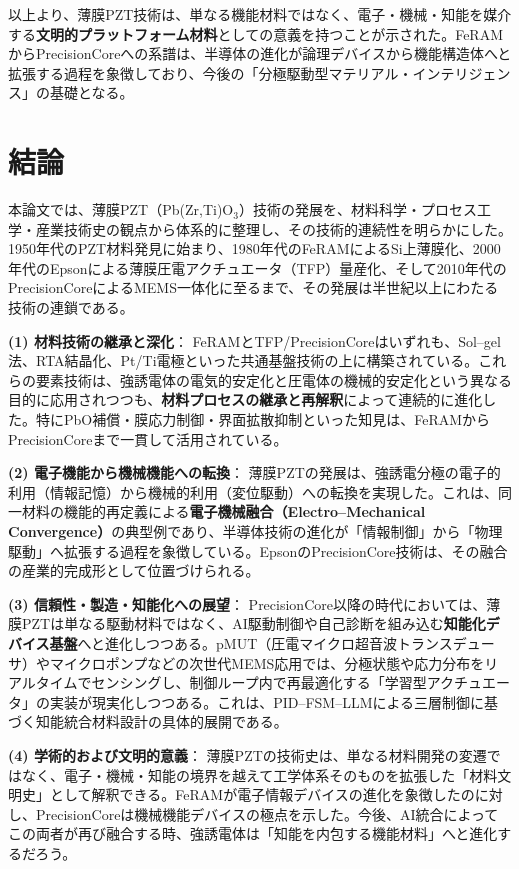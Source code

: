 \documentclass[conference]{IEEEtran}
\begin{document}
\medskip
以上より、薄膜PZT技術は、単なる機能材料ではなく、電子・機械・知能を媒介する\textbf{文明的プラットフォーム材料}としての意義を持つことが示された。FeRAMからPrecisionCoreへの系譜は、半導体の進化が論理デバイスから機能構造体へと拡張する過程を象徴しており、今後の「分極駆動型マテリアル・インテリジェンス」の基礎となる。

\section{結論}
本論文では、薄膜PZT（Pb(Zr,Ti)O$_3$）技術の発展を、材料科学・プロセス工学・産業技術史の観点から体系的に整理し、その技術的連続性を明らかにした。1950年代のPZT材料発見に始まり、1980年代のFeRAMによるSi上薄膜化、2000年代のEpsonによる薄膜圧電アクチュエータ（TFP）量産化、そして2010年代のPrecisionCoreによるMEMS一体化に至るまで、その発展は半世紀以上にわたる技術の連鎖である。

\medskip
\noindent
\textbf{(1) 材料技術の継承と深化}：
FeRAMとTFP/PrecisionCoreはいずれも、Sol--gel法、RTA結晶化、Pt/Ti電極といった共通基盤技術の上に構築されている。これらの要素技術は、強誘電体の電気的安定化と圧電体の機械的安定化という異なる目的に応用されつつも、\textbf{材料プロセスの継承と再解釈}によって連続的に進化した。特にPbO補償・膜応力制御・界面拡散抑制といった知見は、FeRAMからPrecisionCoreまで一貫して活用されている。

\medskip
\noindent
\textbf{(2) 電子機能から機械機能への転換}：
薄膜PZTの発展は、強誘電分極の電子的利用（情報記憶）から機械的利用（変位駆動）への転換を実現した。これは、同一材料の機能的再定義による\textbf{電子機械融合（Electro–Mechanical Convergence）}の典型例であり、半導体技術の進化が「情報制御」から「物理駆動」へ拡張する過程を象徴している。EpsonのPrecisionCore技術は、その融合の産業的完成形として位置づけられる。

\medskip
\noindent
\textbf{(3) 信頼性・製造・知能化への展望}：
PrecisionCore以降の時代においては、薄膜PZTは単なる駆動材料ではなく、AI駆動制御や自己診断を組み込む\textbf{知能化デバイス基盤}へと進化しつつある。pMUT（圧電マイクロ超音波トランスデューサ）やマイクロポンプなどの次世代MEMS応用では、分極状態や応力分布をリアルタイムでセンシングし、制御ループ内で再最適化する「学習型アクチュエータ」の実装が現実化しつつある。これは、PID--FSM--LLMによる三層制御に基づく知能統合材料設計の具体的展開である。

\medskip
\noindent
\textbf{(4) 学術的および文明的意義}：
薄膜PZTの技術史は、単なる材料開発の変遷ではなく、電子・機械・知能の境界を越えて工学体系そのものを拡張した「材料文明史」として解釈できる。FeRAMが電子情報デバイスの進化を象徴したのに対し、PrecisionCoreは機械機能デバイスの極点を示した。今後、AI統合によってこの両者が再び融合する時、強誘電体は「知能を内包する機能材料」へと進化するだろう。
\end{document}
